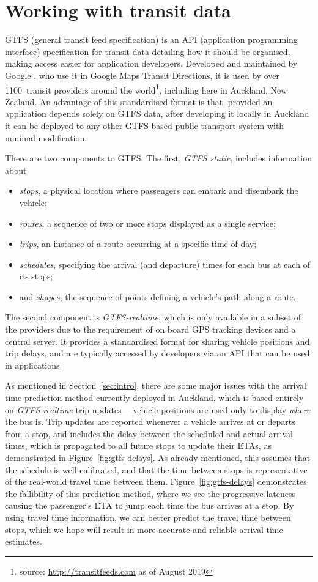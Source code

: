 \section{Working with \rt transit data}
\label{sec:gtfs}

GTFS (general transit feed specification)
is an API (application programming interface) specification for transit data
detailing how it should be organised,
making access easier for application developers.
Developed and maintained by Google \citep{GoogleDevelopers_2006},
who use it in Google Maps Transit Directions,
it is used by over 1100~transit providers around the world\footnote{%
source: \url{http://transitfeeds.com} as of August 2019},
including here in Auckland, New Zealand.
An advantage of this standardised format is that,
provided an application depends solely on GTFS data,
after developing it locally in Auckland it can be deployed to any other GTFS-based
public transport system with minimal modification.


There are two components to GTFS.
The first, \emph{GTFS static}, includes information about
\begin{itemize}
\item \emph{stops}, a physical location where passengers can embark and disembark the vehicle;
\item \emph{routes}, a sequence of two or more stops displayed as a single service;
\item \emph{trips}, an instance of a route occurring at a specific time of day;
\item \emph{schedules}, specifying the arrival (and departure) times for each bus at each of its stops; 
\item and \emph{shapes}, the sequence of points defining a vehicle's path along a route.
\end{itemize}
The second component is \emph{GTFS-realtime},
which is only available in a subset of the providers due to the requirement of 
on board GPS tracking devices and a central server.
It provides a standardised format for sharing vehicle positions and trip delays,
and are typically accessed by developers via an API that can be used in \rt applications.

As mentioned in Section~\ref{sec:intro},
there are some major issues with the arrival time prediction method currently
deployed in Auckland,
which is based entirely on \emph{GTFS-realtime} trip updates---%
vehicle positions are used only to display \emph{where} the bus is.
Trip updates are reported whenever a vehicle arrives at or departs from a stop,
and includes the delay between the scheduled and actual arrival times,
which is propagated to all future stops to update their ETAs,
as demonstrated in Figure~\ref{fig:gtfs-delays}.
As already mentioned, this assumes that the schedule is well calibrated,
and that the time between stops
is representative of the real-world travel time between them. 
Figure~\ref{fig:gtfs-delays} demonstrates the fallibility of this prediction method,
where we see the progressive lateness causing the passenger's ETA to 
jump each time the bus arrives at a stop.
By using \rt travel time information,
we can better predict the travel time between stops,
which we hope will result in more accurate and reliable arrival time estimates.


